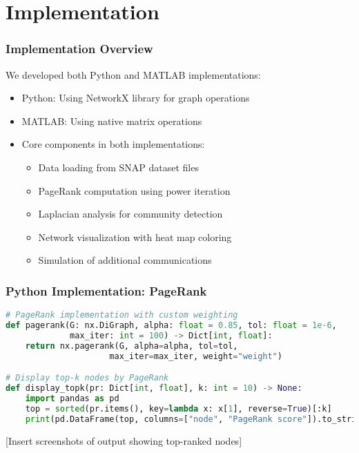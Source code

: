 \documentclass{beamer}
\begin{document}
\section{Implementation}

\begin{frame}
    \frametitle{Implementation Overview}
    We developed both Python and MATLAB implementations:
    \begin{itemize}
        \item Python: Using NetworkX library for graph operations
        \item MATLAB: Using native matrix operations
        \item Core components in both implementations:
        \begin{itemize}
            \item Data loading from SNAP dataset files
            \item PageRank computation using power iteration
            \item Laplacian analysis for community detection
            \item Network visualization with heat map coloring
            \item Simulation of additional communications
        \end{itemize}
    \end{itemize}
\end{frame}

\begin{frame}[fragile]
    \frametitle{Python Implementation: PageRank}
    \begin{lstlisting}[language=Python, basicstyle=\tiny]
# PageRank implementation with custom weighting
def pagerank(G: nx.DiGraph, alpha: float = 0.85, tol: float = 1e-6,
             max_iter: int = 100) -> Dict[int, float]:
    return nx.pagerank(G, alpha=alpha, tol=tol, 
                     max_iter=max_iter, weight="weight")

# Display top-k nodes by PageRank
def display_topk(pr: Dict[int, float], k: int = 10) -> None:
    import pandas as pd
    top = sorted(pr.items(), key=lambda x: x[1], reverse=True)[:k]
    print(pd.DataFrame(top, columns=["node", "PageRank score"]).to_string(index=False))
    \end{lstlisting}
    
    [Insert screenshots of output showing top-ranked nodes]
\end{frame}
\end{document}
